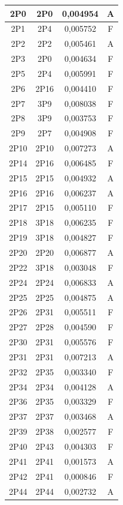 \documentclass[spanish,openright]{book}
\begin{document}
\begin{center}
\begin{longtable}{|c|c|c|c|}
    \hline	2P0	&	2P0	&	0,004954	&	A	\\
    \hline	2P1	&	2P4	&	0,005752	&	F	\\
    \hline	2P2	&	2P2	&	0,005461	&	A	\\
    \hline	2P3	&	2P0	&	0,004634	&	F	\\
    \hline	2P5	&	2P4	&	0,005991	&	F	\\
    \hline	2P6	&	2P16	&	0,004410	&	F	\\
    \hline	2P7	&	3P9	&	0,008038	&	F	\\
    \hline	2P8	&	3P9	&	0,003753	&	F	\\
    \hline	2P9	&	2P7	&	0,004908	&	F	\\
    \hline	2P10	&	2P10	&	0,007273	&	A	\\
    \hline	2P14	&	2P16	&	0,006485	&	F	\\
    \hline	2P15	&	2P15	&	0,004932	&	A	\\
    \hline	2P16	&	2P16	&	0,006237	&	A	\\
    \hline	2P17	&	2P15	&	0,005110	&	F	\\
    \hline	2P18	&	3P18	&	0,006235	&	F	\\
    \hline	2P19	&	3P18	&	0,004827	&	F	\\
    \hline	2P20	&	2P20	&	0,006877	&	A	\\
    \hline	2P22	&	3P18	&	0,003048	&	F	\\
    \hline	2P24	&	2P24	&	0,006833	&	A	\\
    \hline	2P25	&	2P25	&	0,004875	&	A	\\
    \hline	2P26	&	2P31	&	0,005511	&	F	\\
    \hline	2P27	&	2P28	&	0,004590	&	F	\\
    \hline	2P30	&	2P31	&	0,005576	&	F	\\
    \hline	2P31	&	2P31	&	0,007213	&	A	\\
    \hline	2P32	&	2P35	&	0,003340	&	F	\\
    \hline	2P34	&	2P34	&	0,004128	&	A	\\
    \hline	2P36	&	2P35	&	0,003329	&	F	\\
    \hline	2P37	&	2P37	&	0,003468	&	A	\\
    \hline	2P39	&	2P38	&	0,002577	&	F	\\
    \hline	2P40	&	2P43	&	0,004303	&	F	\\
    \hline	2P41	&	2P41	&	0,001573	&	A	\\
    \hline	2P42	&	2P41	&	0,000846	&	F	\\
    \hline	2P44	&	2P44	&	0,002732	&	A	\\

\end{longtable}
\end{center}
\end{document}
